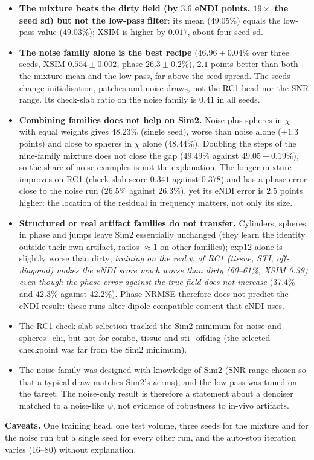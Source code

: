 \documentclass[11pt]{article}
\theoremstyle{remark}
\begin{document}
\begin{itemize}[leftmargin=1.5em,itemsep=2pt]
\item \textbf{The mixture beats the dirty field (by $3.6$ eNDI points, $19\times$ the seed sd) but not the low-pass filter}: its mean (49.05\%) equals the low-pass value (49.03\%); XSIM is higher by $0.017$, about four seed sd.
\item \textbf{The noise family alone is the best recipe} ($46.96\pm0.04$\% over three seeds, XSIM $0.554\pm0.002$, phase $26.3\pm0.2$\%), $2.1$ points better than both the mixture mean and the low-pass, far above the seed spread. The seeds change initialisation, patches and noise draws, not the RC1 head nor the SNR range. Its check-slab ratio on the noise family is $0.41$ in all seeds.
\item \textbf{Combining families does not help on Sim2.} Noise plus spheres in $\chi$ with equal weights gives $48.23\%$ (single seed), worse than noise alone ($+1.3$ points) and close to spheres in $\chi$ alone ($48.44\%$). Doubling the steps of the nine-family mixture does not close the gap ($49.49\%$ against $49.05\pm0.19\%$), so the share of noise examples is not the explanation. The longer mixture improves on RC1 (check-slab score $0.341$ against $0.378$) and has a phase error close to the noise run ($26.5\%$ against $26.3\%$), yet its eNDI error is $2.5$ points higher: the location of the residual in frequency matters, not only its size.
\item \textbf{Structured or real artifact families do not transfer.} Cylinders, spheres in phase and jumps leave Sim2 essentially unchanged (they learn the identity outside their own artifact, ratios $\approx1$ on other families); exp12 alone is slightly worse than dirty; \emph{training on the real $\psi$ of RC1 (tissue, STI, off-diagonal) makes the eNDI score much worse than dirty (60--61\%, XSIM 0.39) even though the phase error against the true field does not increase} (37.4\% and 42.3\% against 42.2\%). Phase NRMSE therefore does not predict the eNDI result: these runs alter dipole-compatible content that eNDI uses.
\item The RC1 check-slab selection tracked the Sim2 minimum for noise and spheres\_chi, but not for combo, tissue and sti\_offdiag (the selected checkpoint was far from the Sim2 minimum).
\item The noise family was designed with knowledge of Sim2 ($\mathrm{SNR}$ range chosen so that a typical draw matches Sim2's $\psi$ rms), and the low-pass was tuned on the target. The noise-only result is therefore a statement about a denoiser matched to a noise-like $\psi$, not evidence of robustness to in-vivo artifacts.
\end{itemize}
\textbf{Caveats.} One training head, one test volume, three seeds for the mixture and for the noise run but a single seed for every other run, and the auto-stop iteration varies (16--80) without explanation.
\end{document}
